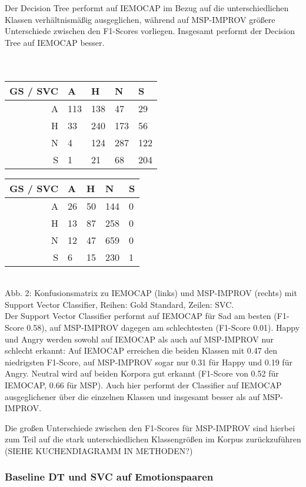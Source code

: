 \documentclass{article} %
\begin{document}
Der Decision Tree performt auf IEMOCAP im Bezug auf die unterschiedlichen Klassen verhältnismäßig ausgeglichen, während auf MSP-IMPROV größere Unterschiede zwischen den F1-Scores vorliegen. Insgesamt performt der Decision Tree auf IEMOCAP besser. \\ \\ \\
\begin{tabular}{|r|llll|}
\hline
GS / SVC & A & H & N & S \\
\hline
A & 113 & 138 & 47 & 29 \\
H & 33 & 240 & 173 & 56 \\
N & 4 & 124 & 287 & 122 \\
S & 1 & 21 & 68 & 204 \\
\hline
\end{tabular} 
\begin{tabular}{|r|llll|}
\hline
GS / SVC & A & H & N & S \\
\hline
A & 26 & 50 & 144 & 0 \\
H & 13 & 87 & 258 & 0 \\
N & 12 & 47 & 659 & 0 \\
S & 6 & 15 & 230 & 1 \\
\hline
\end{tabular} \\

Abb. 2: Konfusionsmatrix zu IEMOCAP (links) und MSP-IMPROV (rechts) mit Support Vector Classifier, Reihen: Gold Standard, Zeilen: SVC. \\

Der Support Vector Classifier performt auf IEMOCAP für Sad am besten (F1-Score 0.58), auf MSP-IMPROV dagegen am schlechtesten (F1-Score 0.01). Happy und Angry werden sowohl auf IEMOCAP als auch auf MSP-IMPROV nur schlecht erkannt: Auf IEMOCAP erreichen die beiden Klassen mit 0.47 den niedrigsten F1-Score, auf MSP-IMPROV sogar nur 0.31 für Happy und 0.19 für Angry. 
Neutral wird auf beiden Korpora gut erkannt (F1-Score von 0.52 für IEMOCAP, 0.66 für MSP). Auch hier performt der Classifier auf IEMOCAP ausgeglichener über die einzelnen Klassen und insgesamt besser als auf MSP-IMPROV. 

Die großen Unterschiede zwischen den F1-Scores für MSP-IMPROV sind hierbei zum Teil auf die stark unterschiedlichen Klassengrößen im Korpus zurückzuführen (SIEHE KUCHENDIAGRAMM IN METHODEN?)

\subsubsection{Baseline DT und SVC auf Emotionspaaren}
\end{document}
